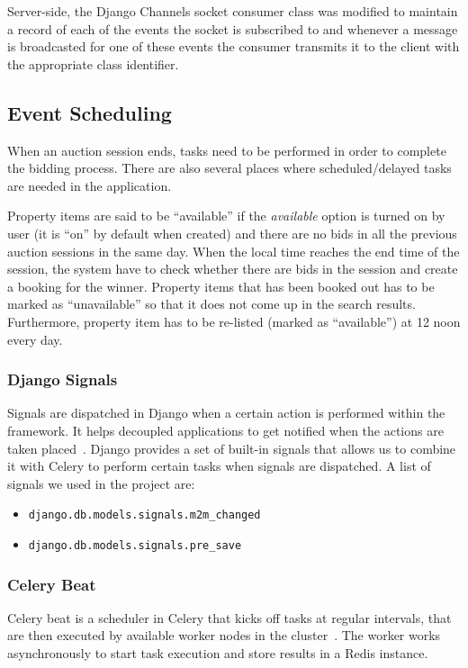 Server-side, the Django Channels socket consumer class was modified to maintain
a record of each of the events the socket is subscribed to and whenever a
message is broadcasted for one of these events the consumer transmits it to
the client with the appropriate class identifier.

\subsection{Event Scheduling}
When an auction session ends, tasks need to be performed in order to complete
the bidding process. There are also several places where scheduled/delayed tasks
are needed in the application.

Property items are said to be ``available'' if the \emph{available} option is
turned on by user (it is ``on'' by default when created) and there are no bids
in all the previous auction sessions in the same day. When the local time
reaches the end time of the session, the system have to check whether there are
bids in the session and create a booking for the winner. Property items that has
been booked out has to be marked as ``unavailable'' so that it does not come up
in the search results. Furthermore, property item has to be re-listed (marked
as ``available'') at 12 noon every day.

\subsubsection{Django Signals}
Signals are dispatched in Django when a certain action is performed within the
framework. It helps decoupled applications to get notified when the actions are
taken placed~\parencite{django-signals}. Django provides a set of built-in signals
that allows us to combine it with Celery to perform certain tasks when signals
are dispatched. A list of signals we used in the project are:

\begin{itemize}
  \item \texttt{django.db.models.signals.m2m\_changed}
  \item \texttt{django.db.models.signals.pre\_save}
\end{itemize}

\subsubsection{Celery Beat}
Celery beat is a scheduler in Celery that kicks off tasks at regular intervals,
that are then executed by available worker nodes in the cluster~\parencite{celery-beat}.
The worker works asynchronously to start task execution and store results in
a Redis instance.

